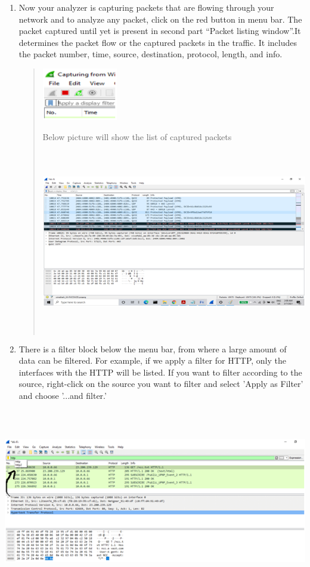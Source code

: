 \documentclass[a4paper,12pt]{report}
\begin{document}
\begin{enumerate}
\def\labelenumi{\arabic{enumi})}
\item
  Now your analyzer is capturing packets that are flowing through your
  network and to analyze any packet, click on the red button in menu
  bar. The packet captured until yet is present in second part ``Packet
  listing window''.It determines the packet flow or the captured packets
  in the traffic. It includes the packet number, time, source,
  destination, protocol, length, and info.


\begin{quote}
\includegraphics[width=1.30729in,height=0.89583in]{image4.png}

Below picture will show the list of captured packets

\includegraphics[width=5.60628in,height=3.16538in]{image1.png}
\end{quote}


\def\labelenumi{\arabic{enumi})}
\item
  There is a filter block below the menu bar, from where a large amount
  of data can be filtered. For example, if we apply a filter for HTTP,
  only the interfaces with the HTTP will be listed. If you want to
  filter according to the source, right-click on the source you want to
  filter and select 'Apply as Filter' and choose '...and filter.'
\end{enumerate}

\includegraphics[width=5.60628in,height=3.16538in]{image2.png}
\end{document}
